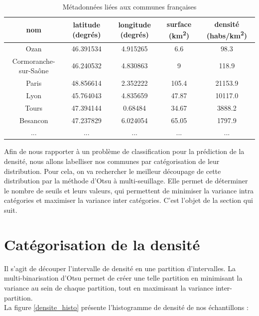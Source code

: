 \documentclass{book}
\begin{document}
\begin{table}[H]
\begin{center}
\begin{adjustbox}{max width=\textwidth}
{
\begin{tabular}{|c|c|c|c|c|}
\hline 
nom & latitude (degrés) & longitude (degrés) & surface (km\textsuperscript{2}) & densité (habs/km\textsuperscript{2}) \\
\hline
Ozan & 46.391534 & 4.915265 & 6.6 & 98.3\\
\hline 
Cormoranche-sur-Sa\^{o}ne & 46.240532 & 4.830863 & 9 & 118.9\\
\hline 
Paris & 48.856614 & 2.352222 & 105.4 & 21153.9\\
\hline
Lyon & 45.764043 & 4.835659 & 47.87 & 10117.0\\
\hline
Tours & 47.394144 & 0.68484 & 34.67 & 3888.2\\
\hline
Besancon & 47.237829 & 6.024054 & 65.05 & 1797.9\\
\hline 
... & ... & ... & ... & ... \\
\hline
\end{tabular}
}
\end{adjustbox}
\end{center}
\caption{Métadonnées liées aux communes françaises}
\label{tab_meta}
\end{table}

Afin de nous rapporter à un problème de classification pour la prédiction de la densité, nous allons labelliser nos communes par catégorisation de leur distribution.
Pour cela, on va rechercher le meilleur découpage de cette distribution par la méthode d'Otsu à multi-seuillage. Elle permet de déterminer le nombre de seuils et leurs
 valeurs, qui permettent de minimiser la variance intra catégories et maximiser la variance inter catégories. C'est l'objet de la section qui suit.

\section{Catégorisation de la densité}\label{cat}

Il s'agit de découper l'intervalle de densité en une partition d'intervalles. La multi-binarisation d'Otsu permet de créer une telle partition en
minimisant la variance au sein de chaque partition, tout en maximisant la variance inter-partition.\\
La figure \ref{densite_histo} présente l'histogramme de densité de nos échantillons :
\end{document}
